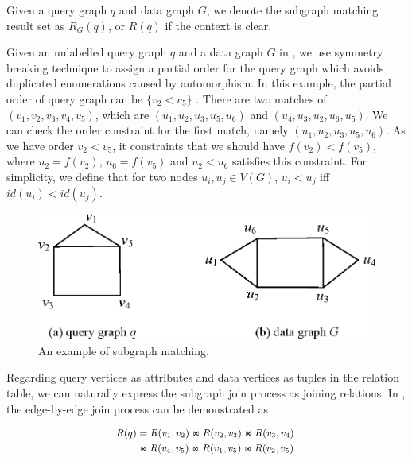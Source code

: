 Given a query graph $q$ and data graph $G$, we denote the subgraph matching result set as $R_G(q)$, or $R(q)$ if the context is clear. \\

\begin{example}
\label{ex:subgraph_isomorphism}	
Given an unlabelled query graph $q$ and a data graph $G$ in , we use symmetry breaking technique\cite{Grochow2007} to assign a partial order for the query graph which avoids duplicated enumerations caused by automorphism. In this example, the partial order of query graph can be $\{v_2 < v_5\}$ . There are two matches of $(v_1, v_2, v_3, v_4, v_5)$, which are $(u_1, u_2, u_3, u_5, u_6)$ and $(u_4, u_3, u_2, u_6, u_5)$. We can check the order constraint for the first match, namely $(u_1, u_2, u_3, u_5, u_6)$. As we have order $v_2 < v_5$, it constraints that we should have $f(v_2) < f(v_5)$, where $u_2 = f(v_2)$, $u_6 = f(v_5)$ and $u_2 < u_6$ satisfies this constraint. For simplicity, we define that for two nodes $u_i, u_j \in V(G)$, $u_i < u_j$ iff $id(u_i) < id(u_j)$. 
\end{example}

\begin{figure}[htb]
  \centering
  \includegraphics[scale=0.6]{figures/subg.eps}
  \caption{\small{An example of subgraph matching.}}
  \label{fig:subgraph_isomorphism}
\end{figure}

Regarding query vertices as attributes and data vertices as tuples in the relation table, we can naturally express the subgraph join process as joining relations. In , the edge-by-edge join process can be demonstrated as

\begin{equation}
\label{eq:subgraph_isomorphism}
\small
\begin{aligned}
	R(q) &= R(v_1, v_2) \Join R(v_2, v_3) \Join R(v_3, v_4) \\ 	
	&\Join R(v_4, v_5) \Join R(v_1, v_5) \Join R(v_2, v_5).
\end{aligned}
\end{equation}

